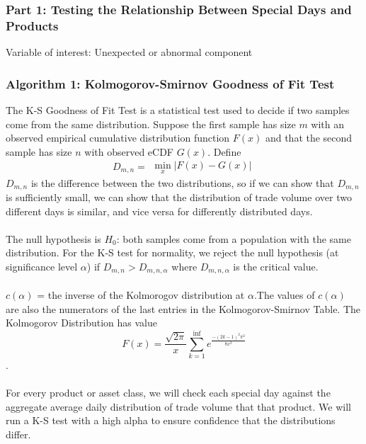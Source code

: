 \documentclass[11pt]{article}
\begin{document}
\subsubsection*{Part 1: Testing the Relationship Between Special Days and Products}
Variable of interest: Unexpected or abnormal component
\subsubsection*{Algorithm 1: Kolmogorov-Smirnov Goodness of Fit Test}
The K-S Goodness of Fit Test is a statistical test used to decide if two samples come from the same distribution. Suppose the first sample has size $m$ with an observed empirical cumulative distribution function $F(x)$ and that the second sample has size $n$ with observed eCDF $G(x)$. Define
\begin{equation}D_{m,n} = 
\begin{aligned}
\min_{x} |F(x) - G(x)|
\end{aligned}
\end{equation}
$D_{m,n}$ is the difference between the two distributions, so if we can show that $D_{m,n}$ is sufficiently small, we can show that the distribution of trade volume over two different days is similar, and vice versa for differently distributed days. 
\\\\The null hypothesis is $H_0$: both samples come from a population with the same distribution. For the K-S test for normality, we reject the null hypothesis (at significance level $\alpha$) if $D_{m,n} > D_{m,n,\alpha}$ where $D_{m,n,\alpha}$ is the critical value. 
\\\\$c(\alpha)$ = the inverse of the Kolmorogov distribution at $\alpha$.The values of $c(\alpha)$ are also the numerators of the last entries in the Kolmogorov-Smirnov Table. The Kolmogorov Distribution has value $$F(x) = \frac{\sqrt{2\pi}}{x} \sum_{k=1}^{\inf} e^{\frac{-(2k-1)^2 \pi^2}{8x^2}}$$.
\\\\For every product or asset class, we will check each special day against the aggregate average daily distribution of trade volume that that product. We will run a K-S test with a high alpha to ensure confidence that the distributions differ.
\end{document}
